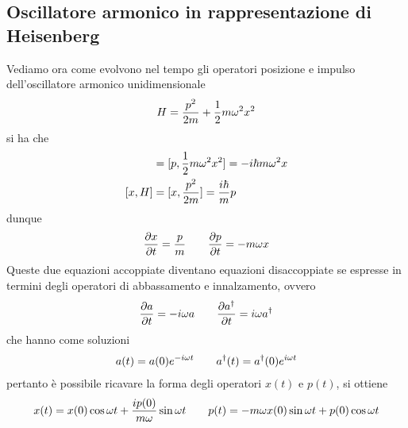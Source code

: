 \documentclass{article}
\begin{document}
\subsection{Oscillatore armonico in rappresentazione di Heisenberg}
Vediamo ora come evolvono nel tempo gli operatori posizione e impulso dell'oscillatore armonico unidimensionale
\begin{gather}
    H = \frac{p^2}{2m} + \frac{1}{2}m\omega^2x^2 \notag
\end{gather}
si ha che
\begin{align}
    [p, H] &= [p, \frac{1}{2}m\omega^2x^2] = -i\hbar m\omega^2x \notag \\
    [x, H] &= [x, \frac{p^2}{2m}] = \frac{i\hbar}{m}p \notag
\end{align}
dunque
\begin{align}
    \frac{\partial x}{\partial t} = \frac{p}{m} \qquad \frac{\partial p}{\partial t} = -m\omega x \notag
\end{align}
Queste due equazioni accoppiate diventano equazioni disaccoppiate se espresse in termini degli operatori di abbassamento e innalzamento, ovvero
\begin{gather}
    \frac{\partial a}{\partial t} = -i\omega a \qquad \frac{\partial a^\dagger}{\partial t} = i\omega a^\dagger \notag
\end{gather}
che hanno come soluzioni
\begin{gather}
    a(t) = a(0)e^{-i\omega t} \qquad a^\dagger(t) = a^\dagger(0)e^{i\omega t} \notag
\end{gather}
pertanto è possibile ricavare la forma degli operatori $x(t)$ e $p(t)$, si ottiene
\begin{gather}
    x(t) = x(0)\cos \omega t + \frac{ip(0)}{m\omega}\sin \omega t \qquad p(t) = -m\omega x(0) \sin \omega t + p(0)\cos \omega t \notag 
\end{gather}
\end{document}
